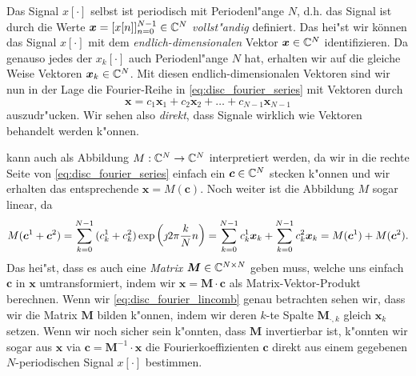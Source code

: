 Das Signal $x[\cdot]$ selbst ist periodisch mit Periodenl"ange $N$, d.h. das Signal ist durch die Werte $\bm x = [x[n]]_{n=0}^{N-1} \in \mathbb{C}^N$ \emph{vollst"andig} definiert. Das hei"st wir k\"onnen das Signal $x[\cdot]$ mit dem \emph{endlich-dimensionalen} Vektor $\bm x \in \mathbb{C}^N$ identifizieren.
Da genauso jedes der $x_k[\cdot]$ auch Periodenl"ange $N$ hat, erhalten wir auf die gleiche Weise Vektoren $\bm x_k \in \mathbb{C}^N$.
Mit diesen endlich-dimensionalen Vektoren sind wir nun in der Lage die Fourier-Reihe in \eqref{eq:disc_fourier_series} mit  Vektoren durch
%
\begin{equation}\label{eq:disc_fourier_lincomb}
    \bm x = c_1 \bm x_1 + c_2 \bm x_2 + \ldots + c_{N-1} \bm x_{N-1}
\end{equation}
%
auszudr"ucken.
Wir sehen also \emph{direkt}, dass Signale wirklich wie Vektoren behandelt werden k"onnen.

 kann auch als Abbildung $M : \mathbb{C}^N \rightarrow \mathbb{C}^N$ interpretiert werden, da wir in die rechte Seite von \eqref{eq:disc_fourier_series} einfach ein $\bm c \in \mathbb{C}^N$ stecken k"onnen und wir erhalten das entsprechende $\bm x = M(\bm c)$.
Noch weiter ist die Abbildung $M$ sogar linear, da 
\[
    M(\bm c^1 + \bm c^2)
        =  {\sum\limits_{k = 0}^{N-1}{
            (c^1_k + c^2_k) \exp\left(
                \jmath 2 \pi \frac{k}{N} n
            \right) 
        }}
        =  {\sum\limits_{k = 0}^{N-1}{
            c^1_k \bm x_k
        }}
        + {\sum\limits_{k = 0}^{N-1}{
            c^2_k \bm x_k 
        }}
        = M(\bm c^1) + M(\bm c^2).
\]
Das hei"st, dass es auch eine \emph{Matrix} $\bm M \in \mathbb{C}^{N \times N}$ geben muss, welche uns einfach $\bm c$ in $\bm x$ umtransformiert, indem wir $\bm x = \bm M \cdot \bm c$ als Matrix-Vektor-Produkt berechnen.
Wenn wir \eqref{eq:disc_fourier_lincomb} genau betrachten sehen wir, dass wir die Matrix $\bm M$ bilden k"onnen, indem wir deren $k$-te Spalte $\bm M_{\cdot, k}$ gleich $\bm x_k$ setzen.
Wenn wir noch sicher sein k"onnten, dass $\bm M$ invertierbar ist, k"onnten wir sogar aus $\bm x$ via $\bm c = \bm M^{-1} \cdot \bm x$ die Fourierkoeffizienten $\bm c$ direkt aus einem gegebenen $N$-periodischen Signal $x[\cdot]$ bestimmen.
%
%
